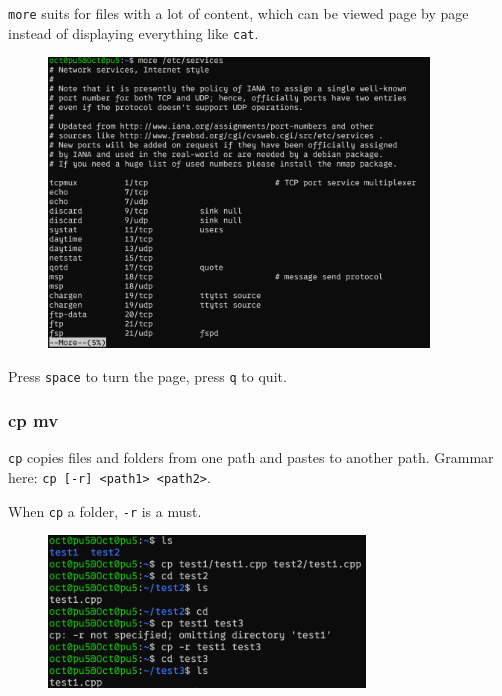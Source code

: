 \documentclass[12pt]{ctexart}
\newenvironment{mdquote}
{%
  \par\noindent
  \begin{list}{}{%
      \setlength{\leftmargin}{1em}%
      \setlength{\rightmargin}{0pt}%
      \setlength{\itemindent}{0pt}%
      \setlength{\listparindent}{\parindent}%
      \setlength{\topsep}{0.5\baselineskip}%
  }
  \item[\textbf{>}\ ]\itshape
}
{\end{list}\par}
\begin{document}
\texttt{more} suits for files with a lot of content, which can be viewed
page by page instead of displaying everything like \texttt{cat}.

\begin{figure}[H]
    \centering
    \includegraphics[width=0.9\textwidth,keepaspectratio]{assets/Linux/1.5 Linux file commands/3.png}
\end{figure}

\begin{mdquote}
Press \texttt{space} to turn the page, press \texttt{q} to quit.
\end{mdquote}

\subsubsection{\textbf{cp mv}}

\texttt{cp} copies files and folders from one path and pastes to another
path. Grammar here:
\texttt{cp\ {[}-r{]}\ \textless{}path1\textgreater{}\ \textless{}path2\textgreater{}}.

When \texttt{cp} a folder, \texttt{-r} is a must.

\begin{figure}[H]
    \centering
    \includegraphics[width=0.75\textwidth,keepaspectratio]{assets/Linux/1.5 Linux file commands/4.png}
\end{figure}
\end{document}
